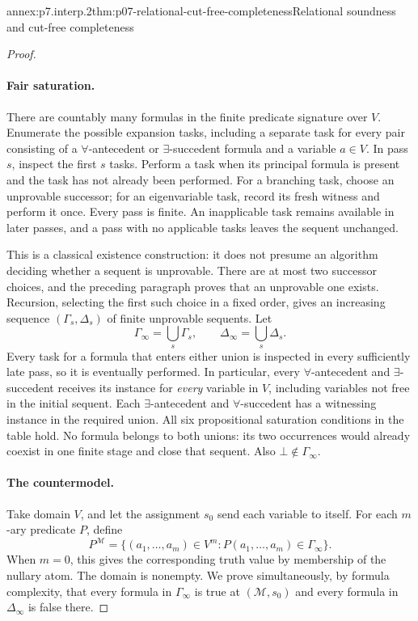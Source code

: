 \begin{annexitem}{annex:p7.interp.2}{thm:p07-relational-cut-free-completeness}{Relational soundness and cut-free completeness}
\begin{proof}
\paragraph{Fair saturation.}
There are countably many formulas in the finite predicate signature
over \(V\).  Enumerate the possible expansion tasks, including a separate
task for every pair consisting of a \(\forall\)-antecedent or
\(\exists\)-succedent formula and a variable \(a\in V\).
In pass \(s\), inspect the first \(s\) tasks.  Perform a task when
its principal formula is present and the task has not already been
performed.  For a branching task, choose an unprovable successor;
for an eigenvariable task, record its fresh witness and perform it
once.  Every pass is finite.  An inapplicable task remains available
in later passes, and a pass with no applicable tasks leaves the
sequent unchanged.

This is a classical existence construction: it does not presume an
algorithm deciding whether a sequent is unprovable.  There are at
most two successor choices, and the preceding paragraph proves that
an unprovable one exists.  Recursion, selecting the first such choice
in a fixed order, gives an increasing sequence
\((\Gamma_s,\Delta_s)\) of finite unprovable sequents.
Let
\[
 \Gamma_\infty=\bigcup_s\Gamma_s,\qquad
 \Delta_\infty=\bigcup_s\Delta_s.
\]
Every task for a formula that enters either union is inspected in
every sufficiently late pass, so it is eventually performed.
In particular, every \(\forall\)-antecedent and
\(\exists\)-succedent receives its instance for \emph{every} variable
in \(V\), including variables not free in the initial sequent.
Each \(\exists\)-antecedent and \(\forall\)-succedent has a witnessing
instance in the required union.  All six propositional saturation
conditions in the table hold.
No formula belongs to both unions: its two occurrences would already
coexist in one finite stage and close that sequent.
Also \(\bot\notin\Gamma_\infty\).

\paragraph{The countermodel.}
Take domain \(V\), and let the assignment \(s_0\) send each variable
to itself.  For each \(m\)-ary predicate \(P\), define
\[
 P^{\mathcal M}
   =\{(a_1,\ldots,a_m)\in V^m:
                    P(a_1,\ldots,a_m)\in\Gamma_\infty\}.
\]
When \(m=0\), this gives the corresponding truth value by membership
of the nullary atom.  The domain is nonempty.
We prove simultaneously, by formula complexity, that every formula
in \(\Gamma_\infty\) is true at \((\mathcal M,s_0)\) and every
formula in \(\Delta_\infty\) is false there.


\end{proof}
\end{annexitem}
